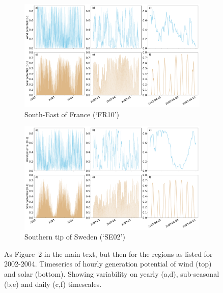\documentclass[12pt]{iopart}
\begin{document}
\begin{figure}[hb]
\centering
    \begin{subfigure}[t]{\linewidth}
        \centering
        \includegraphics[width=\textwidth]{additional_regions/Climatological_Behaviour_FR10.pdf}
        \caption{South-East of France (`FR10')}
    \end{subfigure}
    \begin{subfigure}[t]{\linewidth}
        \centering
        \includegraphics[width=\textwidth]{additional_regions/Climatological_Behaviour_SE02.pdf}
        \caption{Southern tip of Sweden (`SE02')}
    \end{subfigure}
    \caption{
        As Figure~2 in the main text, but then for the regions as listed for 2002-2004.
        Timeseries of hourly generation potential of wind (top) and solar (bottom). 
        Showing variability on yearly (a,d), sub-seasonal (b,e) and daily (c,f) timescales. 
    }
    \label{SIfig:climatological_behaviour_other-regions}
\end{figure}
\end{document}
